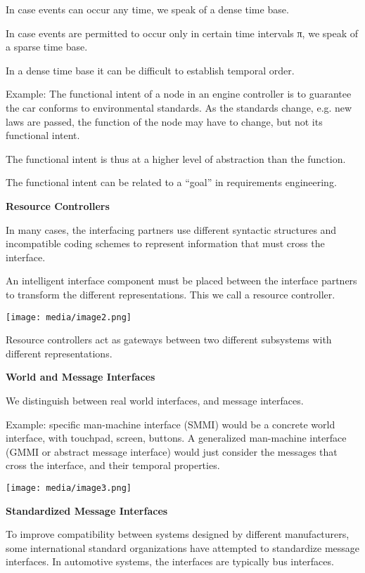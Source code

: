 In case events can occur any time, we speak of a dense time base.

In case events are permitted to occur only in certain time intervals π,
we speak of a sparse time base.

In a dense time base it can be difficult to establish temporal order.

Example: The functional intent of a node in an engine controller is to
guarantee the car conforms to environmental standards. As the standards
change, e.g. new laws are passed, the function of the node may have to
change, but not its functional intent.

The functional intent is thus at a higher level of abstraction than the
function.

The functional intent can be related to a ``goal'' in requirements
engineering.

\textbf{Resource Controllers}

In many cases, the interfacing partners use different syntactic
structures and incompatible coding schemes to represent information that
must cross the interface.

An intelligent interface component must be placed between the interface
partners to transform the different representations. This we call a
resource controller.

\texttt{[image: media/image2.png]}

Resource controllers act as gateways between two different subsystems
with different representations.

\textbf{World and Message Interfaces}

We distinguish between real world interfaces, and message interfaces.

Example: specific man-machine interface (SMMI) would be a concrete world
interface, with touchpad, screen, buttons. A generalized man-machine
interface (GMMI or abstract message interface) would just consider the
messages that cross the interface, and their temporal properties.

\texttt{[image: media/image3.png]}

\textbf{Standardized Message Interfaces}

To improve compatibility between systems designed by different
manufacturers, some international standard organizations have attempted
to standardize message interfaces. In automotive systems, the interfaces
are typically bus interfaces.


